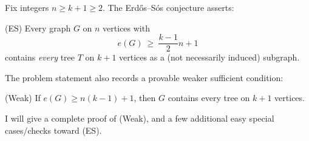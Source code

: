 Fix integers $n\ge k+1\ge 2$. The Erd\H{o}s--S\'os conjecture asserts:

\quad(ES) Every graph $G$ on $n$ vertices with
\[
 e(G)\ \ge\ \frac{k-1}{2}n + 1
\]
contains \emph{every} tree $T$ on $k+1$ vertices as a (not necessarily induced) subgraph.

The problem statement also records a provable weaker sufficient condition:

\quad(Weak) If $e(G)\ge n(k-1)+1$, then $G$ contains every tree on $k+1$ vertices.

I will give a complete proof of (Weak), and a few additional easy special cases/checks toward (ES).
